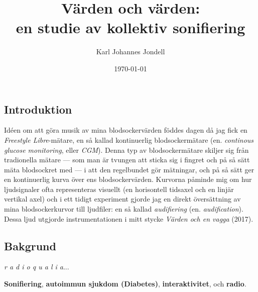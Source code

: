 \documentclass[11pt, twoside, a4paper]{article}
\title{Värden och värden:\\
	\large en studie av kollektiv sonifiering
}
\author{Karl Johannes Jondell}
\date{\today}
\begin{document}



\tableofcontents
\clearpage

\newpage
\begin{multicols}{2}

\section*{Introduktion}

Idéen om att göra musik av mina blodsockervärden föddes dagen då jag fick en \emph{Freestyle Libre}-mätare, en så kallad kontinuerlig blodsockermätare (en. \emph{continous glucose monitoring}, eller \emph{CGM}). Denna typ av blodsockermätare skiljer sig från tradionella mätare --- som man är tvungen att sticka sig i fingret och på så sätt mäta blodsockret med --- i att den regelbundet gör mätningar, och på så sätt ger en kontinuerlig kurva över ens blodsockervärden. Kurvorna påminde mig om hur ljudsignaler ofta representeras visuellt (en horisontell tidsaxel och en linjär vertikal axel) och i ett tidigt experiment gjorde jag en direkt översättning av mina blodsockerkurvor till ljudfiler: en så kallad \emph{audifiering} (en. \emph{audification}). Dessa ljud utgjorde instrumentationen i mitt stycke \emph{Värden och en vagga} (2017). %





\subsection*{Bakgrund}
\emph{r a d i o q u a l i a}...

\textbf{Sonifiering}, \textbf{autoimmun sjukdom (Diabetes)}, \textbf{interaktivitet}, och \textbf{radio}.



\end{multicols}
\end{document}
